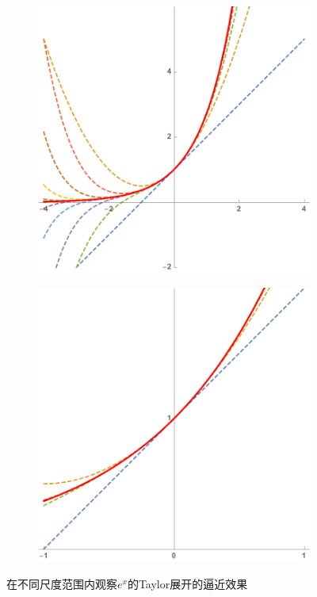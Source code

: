 \begin{figure}[h]
\begin{subfigure}[t]{0.3\textwidth}
		\includegraphics[width=\textwidth]{./Images/Ch03/ex4.pdf}
	\end{subfigure}
	\begin{subfigure}[t]{0.3\textwidth}
		\centering
		\includegraphics[width=\textwidth]{./Images/Ch03/ex1.pdf}
	\end{subfigure}
	\caption{在不同尺度范围内观察$e^x$的Taylor展开的逼近效果}
	\label{fig:exTaylor}
\end{figure}

